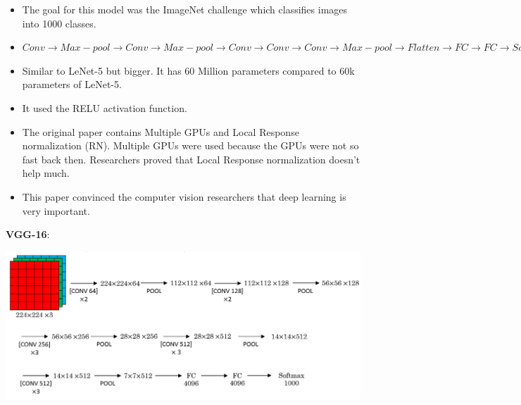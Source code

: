 \documentclass{article}
\begin{document}
\begin{itemize}
    \item The goal for this model was the ImageNet challenge which classifies images into 1000 classes.
    \item \(Conv \longrightarrow Max-pool \longrightarrow Conv \longrightarrow Max-pool \longrightarrow Conv \longrightarrow Conv \longrightarrow Conv \longrightarrow Max-pool \longrightarrow Flatten \longrightarrow FC \longrightarrow FC \longrightarrow Softmax\)
    \item Similar to LeNet-5 but bigger. It has 60 Million parameters compared to 60k parameters of LeNet-5.
    \item It used the RELU activation function.
    \item The original paper contains Multiple GPUs and Local Response normalization (RN). Multiple GPUs were used because the GPUs were not so fast back then. Researchers proved that Local Response normalization doesn't help much.
    \item This paper convinced the computer vision researchers that deep learning is very important.
\end{itemize}

\noindent \textbf{VGG-16}:

\begin{center}
\includegraphics[scale=0.3]{./images/vgg16.png}
\end{center}
\end{document}

